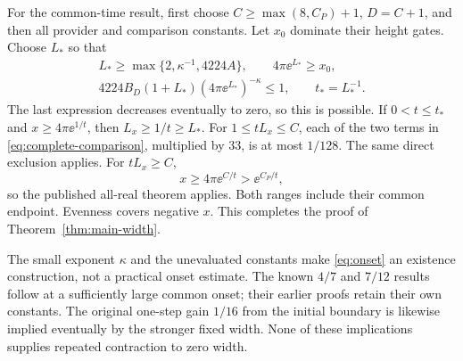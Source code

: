 For the common-time result, first choose
$C\ge\max(8,C_P)+1$, $D=C+1$, and then all provider and comparison
constants. Let $x_0$ dominate their height gates. Choose $L_*$ so that
\begin{equation}\label{eq:onset}
 \begin{gathered}
 L_*\ge\max\{2,\kappa^{-1},4224A\},\qquad4\pi\ee^{L_*}\ge x_0,\\
 4224B_D(1+L_*)(4\pi\ee^{L_*})^{-\kappa}\le1,
 \qquad t_*=L_*^{-1}.
 \end{gathered}
\end{equation}
The last expression decreases eventually to zero, so this is possible.
If $0<t\le t_*$ and $x\ge4\pi\ee^{1/t}$, then $L_x\ge1/t\ge L_*$.
For $1\le tL_x\le C$, each of the two terms in
\eqref{eq:complete-comparison}, multiplied by 33, is at most $1/128$.
The same direct exclusion applies. For $tL_x\ge C$,
\[
 x\ge4\pi\ee^{C/t}>\ee^{C_P/t},
\]
so the published all-real theorem applies. Both ranges include their
common endpoint. Evenness covers negative $x$. This completes the
proof of Theorem~\ref{thm:main-width}.

The small exponent $\kappa$ and the unevaluated constants make
\eqref{eq:onset} an existence construction, not a practical onset
estimate. The known $4/7$ and $7/12$ results follow at a sufficiently
large common onset; their earlier proofs retain their own constants.
The original one-step gain $1/16$ from the initial boundary is likewise
implied eventually by the stronger fixed width. None of these
implications supplies repeated contraction to zero width.
